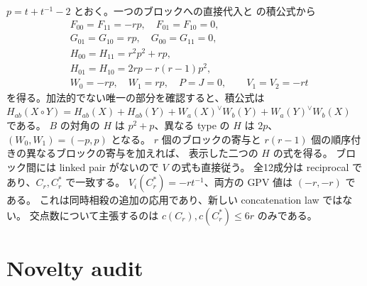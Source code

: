 \documentclass[12pt]{amsart}
\theoremstyle{definition}
\theoremstyle{remark}
\numberwithin{equation}{section}
\begin{document}
$p=t+t^{-1}-2$ とおく。一つのブロックへの直接代入と
\cite[Theorem 6.2]{NNSW1} の積公式から
\begin{align*}
&F_{00}=F_{11}=-rp,\quad F_{01}=F_{10}=0,\\
&G_{01}=G_{10}=rp,\quad G_{00}=G_{11}=0,\\
&H_{00}=H_{11}=r^2p^2+rp,\\
&H_{01}=H_{10}=2rp-r(r-1)p^2,\\
&W_0=-rp,\quad W_1=rp,\quad P=J=0,\qquad V_1=V_2=-rt
\end{align*}
を得る。加法的でない唯一の部分を確認すると、積公式は
$H_{ab}(X\circ Y)=H_{ab}(X)+H_{ab}(Y)+W_a(X)^\vee W_b(Y)
+W_a(Y)^\vee W_b(X)$ である。
$B$ の対角の $H$ は $p^2+p$、異なる type の $H$ は $2p$、
$(W_0,W_1)=(-p,p)$ となる。
$r$ 個のブロックの寄与と $r(r-1)$ 個の順序付きの異なるブロックの寄与を加えれば、
表示した二つの $H$ の式を得る。
ブロック間には linked pair がないので $V$ の式も直接従う。
全12成分は reciprocal であり、$C_r,C_r^*$ で一致する。
$V_i(C_r^*)=-rt^{-1}$、両方の GPV 値は $(-r,-r)$ である。
これは同時相殺の追加の応用であり、新しい concatenation law ではない。
交点数について主張するのは $c(C_r),c(C_r^*)\le6r$ のみである。

\section{Novelty audit}\label{ja:audit}
\end{document}
